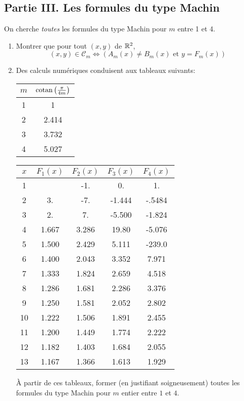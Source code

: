 \subsection*{Partie III. Les formules du type Machin}
On cherche \emph{toutes} les formules du type Machin pour $m$ entre 1 et 4.
\begin{enumerate}
\item Montrer que pour tout $(x,y)$ de $\mathbb{R}^2$,
\begin{displaymath}
(x,y)\in \mathcal{C}_m \Leftrightarrow \left( A_m(x) \neq B_m(x) \text{ et } y=F_m(x)\right) 
\end{displaymath}

\item Des calculs numériques conduisent aux tableaux suivants:
\begin{center}
\renewcommand{\arraystretch}{1.5}
\hspace{1cm}
\begin{tabular}{c|c}
 $m$ & $\operatorname{cotan}\left( \frac{\pi}{4m}\right) $ \\ \hline 
1 &  1 \\ \hline
2 &  2.414\\ \hline
3 & 3.732 \\ \hline
4 & 5.027
\end{tabular}
\hfill
\begin{tabular}{c|c|c|c|c}
$x$ & $F_1(x)$ & $F_2(x)$ & $F_3(x)$ & $F_4(x)$ \\ \hline
1   &          & -1.      & 0.       & 1.       \\ \hline
2   & 3.       & -7.      & -1.444   & -.5484   \\ \hline
3   & 2.       & 7.       & -5.500   & -1.824   \\ \hline
4   & 1.667    & 3.286    & 19.80    & -5.076   \\ \hline
5   & 1.500    & 2.429    & 5.111    & -239.0   \\ \hline
6   & 1.400    & 2.043    & 3.352    & 7.971    \\ \hline
7   & 1.333    & 1.824    & 2.659    & 4.518    \\ \hline
8   & 1.286    & 1.681    & 2.286    & 3.376    \\ \hline
9   & 1.250    & 1.581    & 2.052    & 2.802    \\ \hline
10  & 1.222    & 1.506    & 1.891    & 2.455    \\ \hline
11  & 1.200    & 1.449    & 1.774    & 2.222    \\ \hline
12  & 1.182    & 1.403    & 1.684    & 2.055    \\ \hline
13  & 1.167    & 1.366    & 1.613    & 1.929
\end{tabular} 
\hspace*{1.5cm}
\end{center}
{\`A} partir de ces tableaux, former (en justifiant soigneusement) toutes les formules du type Machin pour $m$ entier entre $1$ et $4$.
\end{enumerate}

